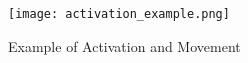 \documentclass[11pt,fleqn]{book} %
\begin{document}
\begin{figure}[h]
\centering
\texttt{[image: activation\_example.png]}
\caption{ Example of Activation and Movement}
\label{fig:example_activation}
\end{figure}








\end{document}

